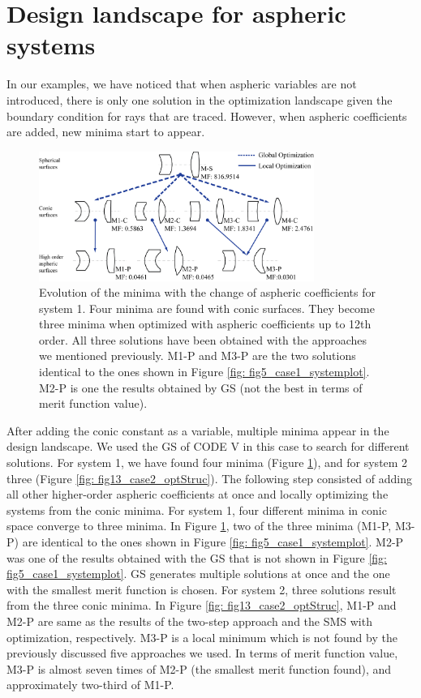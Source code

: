 \section{Design landscape for aspheric systems}
In our examples, we have noticed that when aspheric variables are not introduced, there is only one solution in the optimization landscape given the boundary condition for rays that are traced. However, when aspheric coefficients are added, new minima start to appear. 

\begin{figure}[h!]
    \centering
    \includegraphics[width=0.8\textwidth]{chapter-5/figures/Fig12_System1_structure.png}
    \caption{Evolution of the minima with the change of aspheric coefficients for system 1. Four minima are found with conic surfaces. They become three minima when optimized with aspheric coefficients up to 12th order. All three solutions have been obtained with the approaches we mentioned previously. M1-P and M3-P are the two solutions identical to the ones shown in Figure \ref{fig: fig5_case1_systemplot}. M2-P is one the results obtained by GS (not the best in terms of merit function value). }
    \label{fig: fig12_case1_optStruc}
\end{figure}

After adding the conic constant as a variable, multiple minima appear in the design landscape. We used the GS of CODE V in this case to search for different solutions. For system 1, we have found four minima (Figure \ref{fig: fig12_case1_optStruc}), and for system 2 three (Figure \ref{fig: fig13_case2_optStruc}). 
The following step consisted of adding all other higher-order aspheric coefficients at once and locally optimizing the systems from the conic minima. For system 1, four different minima in conic space converge to three minima. In Figure \ref{fig: fig12_case1_optStruc}, two of the three minima (M1-P, M3-P) are identical to the ones shown in Figure \ref{fig: fig5_case1_systemplot}. M2-P was one of the results obtained with the GS that is not shown in Figure \ref{fig: fig5_case1_systemplot}. GS generates multiple solutions at once and the one with the smallest merit function is chosen. For system 2, three solutions result from the three conic minima. In Figure \ref{fig: fig13_case2_optStruc}, M1-P and M2-P are same as the results of the two-step approach and the SMS with optimization, respectively. M3-P is a local minimum which is not found by the previously discussed five approaches we used. In terms of merit function value, M3-P is almost seven times of M2-P (the smallest merit function found), and approximately two-third of M1-P.

